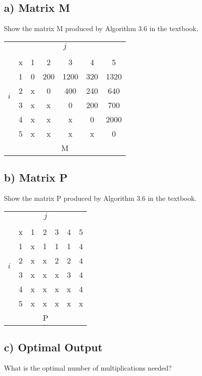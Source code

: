 \documentclass[11pt]{article}
\begin{document}
\subsection*{a) Matrix M}
Show the matrix M produced by Algorithm 3.6 in the textbook. \\

\bigskip

\begin{center}
\begin{tabular}{c c | c c c c c}
	\multicolumn{7}{c}{$j$} \\
	\multirow{7}{*}{$i$} \\
	& x & 1 & 2 & 3 & 4 & 5 \\
	\hline
	& 1 & 0 & 200 & 1200 & 320 & 1320 \\
	& 2 & x & 0 & 400 & 240 & 640 \\
	& 3 & x & x & 0 & 200 & 700 \\
	& 4 & x & x & x & 0 & 2000 \\
	& 5 & x & x & x & x & 0 \\ [0.2cm]
	\multicolumn{7}{c}{M} \\
\end{tabular}
\end{center}


\subsection*{b) Matrix P}
Show the matrix P produced by Algorithm 3.6 in the textbook. \\

\bigskip

\begin{center}
\begin{tabular}{c c | c c c c c}
	\multicolumn{7}{c}{$j$} \\
	\multirow{7}{*}{$i$} \\
	& x & 1 & 2 & 3 & 4 & 5 \\
	\hline
	& 1 & x & 1 & 1 & 1 & 4 \\
	& 2 & x & x & 2 & 2 & 4 \\
	& 3 & x & x & x & 3 & 4 \\
	& 4 & x & x & x & x & 4 \\
	& 5 & x & x & x & x & x \\ [0.2cm]
	\multicolumn{7}{c}{P} \\
\end{tabular}
\end{center}

\subsection*{c) Optimal Output}
What is the optimal number of multiplications needed? \\
\end{document}
